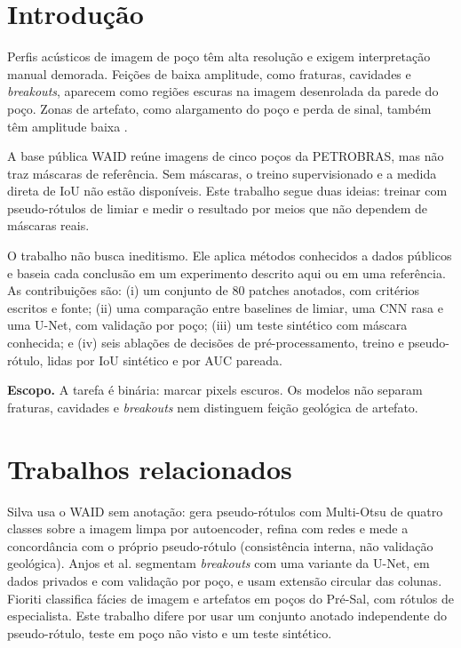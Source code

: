 \documentclass[12pt]{article}
\newif\ifrascunho \rascunhofalse
\newcommand{\fonte}[1]{\ifrascunho\textcolor{blue}{\small(README, #1)}\fi}
\begin{document}
\section{Introdução}

Perfis acústicos de imagem de poço têm alta resolução e exigem interpretação manual demorada. Feições de baixa amplitude, como fraturas, cavidades e \textit{breakouts}, aparecem como regiões escuras na imagem desenrolada da parede do poço. Zonas de artefato, como alargamento do poço e perda de sinal, também têm amplitude baixa \cite{fioriti2026,lofts1999}.

A base pública WAID \cite{waid} reúne imagens de cinco poços da PETROBRAS, mas não traz máscaras de referência. Sem máscaras, o treino supervisionado e a medida direta de IoU não estão disponíveis. Este trabalho segue duas ideias: treinar com pseudo-rótulos de limiar e medir o resultado por meios que não dependem de máscaras reais.

O trabalho não busca ineditismo. Ele aplica métodos conhecidos a dados públicos e baseia cada conclusão em um experimento descrito aqui ou em uma referência. As contribuições são: (i) um conjunto de 80 patches anotados, com critérios escritos e fonte; (ii) uma comparação entre baselines de limiar, uma CNN rasa e uma U-Net, com validação por poço; (iii) um teste sintético com máscara conhecida; e (iv) seis ablações de decisões de pré-processamento, treino e pseudo-rótulo, lidas por IoU sintético e por AUC pareada.

\textbf{Escopo.} A tarefa é binária: marcar pixels escuros. Os modelos não separam fraturas, cavidades e \textit{breakouts} nem distinguem feição geológica de artefato.

\section{Trabalhos relacionados}

Silva \cite{silva2026} usa o WAID sem anotação: gera pseudo-rótulos com Multi-Otsu de quatro classes sobre a imagem limpa por autoencoder, refina com redes e mede a concordância com o próprio pseudo-rótulo (consistência interna, não validação geológica). Anjos et al. \cite{anjos2022} segmentam \textit{breakouts} com uma variante da U-Net, em dados privados e com validação por poço, e usam extensão circular das colunas. Fioriti \cite{fioriti2026} classifica fácies de imagem e artefatos em poços do Pré-Sal, com rótulos de especialista. Este trabalho difere por usar um conjunto anotado independente do pseudo-rótulo, teste em poço não visto e um teste sintético. \fonte{item 13 da tabela B}
\end{document}
